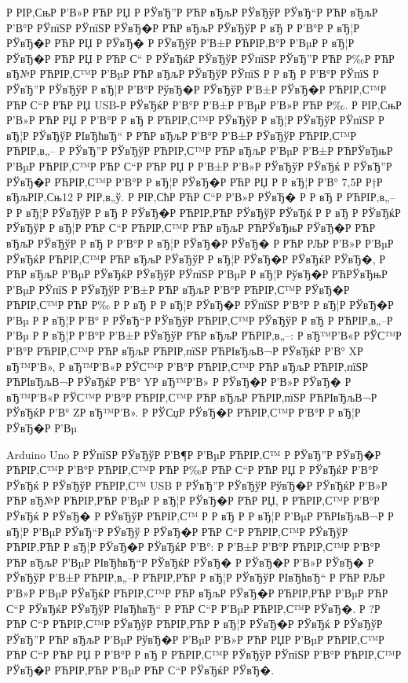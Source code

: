 \documentclass[a4paper,14pt]{extarticle}
\begin{document}
Р  РІР‚СњР  Р’В»Р РЋР РЏ Р  РЎвЂ”Р РЋР вЂљР  РЎвЂўР  РЎвЂ“Р РЋР вЂљР  Р’В°Р  РЎпїЅР  РЎпїЅР  РЎвЂ�Р РЋР вЂљР  РЎвЂўР  Р вЂ Р  Р’В°Р  Р вЂ¦Р  РЎвЂ�Р РЋР РЏ Р  РЎвЂ� Р  РЎвЂўР  Р’В±Р РЋРІР‚В°Р  Р’ВµР  Р вЂ¦Р  РЎвЂ�Р РЋР РЏ Р РЋР С“ Р  РЎвЂќР  РЎвЂўР  РЎпїЅР  РЎвЂ”Р РЋР Р‰Р РЋР вЂ№Р РЋРІР‚С™Р  Р’ВµР РЋР вЂљР  РЎвЂўР  РЎпїЅ Р  Р вЂ Р  Р’В°Р  РЎпїЅ Р  РЎвЂ”Р  РЎвЂўР  Р вЂ¦Р  Р’В°Р  РўвЂ�Р  РЎвЂўР  Р’В±Р  РЎвЂ�Р РЋРІР‚С™Р РЋР С“Р РЋР РЏ USB-Р  РЎвЂќР  Р’В°Р  Р’В±Р  Р’ВµР  Р’В»Р РЋР Р‰. Р  РІР‚СњР  Р’В»Р РЋР РЏ Р  Р’В°Р  Р вЂ Р РЋРІР‚С™Р  РЎвЂўР  Р вЂ¦Р  РЎвЂўР  РЎпїЅР  Р вЂ¦Р  РЎвЂўР  РІвЂћвЂ“ Р РЋР вЂљР  Р’В°Р  Р’В±Р  РЎвЂўР РЋРІР‚С™Р РЋРІР‚в„– Р  РЎвЂ”Р  РЎвЂўР РЋРІР‚С™Р РЋР вЂљР  Р’ВµР  Р’В±Р РЋРЎвЂњР  Р’ВµР РЋРІР‚С™Р РЋР С“Р РЋР РЏ Р  Р’В±Р  Р’В»Р  РЎвЂўР  РЎвЂќ Р  РЎвЂ”Р  РЎвЂ�Р РЋРІР‚С™Р  Р’В°Р  Р вЂ¦Р  РЎвЂ�Р РЋР РЏ Р  Р вЂ¦Р  Р’В° 7,5Р Р†Р вЂљРІР‚Сњ12 Р  РІР‚в„ў. Р  РІР‚СћР РЋР С“Р  Р’В»Р  РЎвЂ� Р  Р вЂ Р РЋРІР‚в„– Р  Р вЂ¦Р  РЎвЂўР  Р вЂ Р  РЎвЂ�Р РЋРІР‚РЋР  РЎвЂўР  РЎвЂќ Р  Р вЂ  Р  РЎвЂќР  РЎвЂўР  Р вЂ¦Р РЋР С“Р РЋРІР‚С™Р РЋР вЂљР РЋРЎвЂњР  РЎвЂ�Р РЋР вЂљР  РЎвЂўР  Р вЂ Р  Р’В°Р  Р вЂ¦Р  РЎвЂ�Р  РЎвЂ� Р РЋР РЉР  Р’В»Р  Р’ВµР  РЎвЂќР РЋРІР‚С™Р РЋР вЂљР  РЎвЂўР  Р вЂ¦Р  РЎвЂ�Р  РЎвЂќР  РЎвЂ�, Р РЋР вЂљР  Р’ВµР  РЎвЂќР  РЎвЂўР  РЎпїЅР  Р’ВµР  Р вЂ¦Р  РўвЂ�Р РЋРЎвЂњР  Р’ВµР  РЎпїЅ Р  РЎвЂўР  Р’В±Р РЋР вЂљР  Р’В°Р РЋРІР‚С™Р  РЎвЂ�Р РЋРІР‚С™Р РЋР Р‰ Р  Р вЂ Р  Р вЂ¦Р  РЎвЂ�Р  РЎпїЅР  Р’В°Р  Р вЂ¦Р  РЎвЂ�Р  Р’Вµ Р  Р вЂ¦Р  Р’В° Р  РЎвЂ“Р  РЎвЂўР РЋРІР‚С™Р  РЎвЂўР  Р вЂ Р РЋРІР‚в„–Р  Р’Вµ Р  Р вЂ¦Р  Р’В°Р  Р’В±Р  РЎвЂўР РЋР вЂљР РЋРІР‚в„–: Р вЂ™Р’В«Р  РЎС™Р  Р’В°Р РЋРІР‚С™Р РЋР вЂљР РЋРІР‚пїЅР РЋРІвЂљВ¬Р  РЎвЂќР  Р’В° XР вЂ™Р’В», Р вЂ™Р’В«Р  РЎС™Р  Р’В°Р РЋРІР‚С™Р РЋР вЂљР РЋРІР‚пїЅР РЋРІвЂљВ¬Р  РЎвЂќР  Р’В° YР вЂ™Р’В» Р  РЎвЂ�Р  Р’В»Р  РЎвЂ� Р вЂ™Р’В«Р  РЎС™Р  Р’В°Р РЋРІР‚С™Р РЋР вЂљР РЋРІР‚пїЅР РЋРІвЂљВ¬Р  РЎвЂќР  Р’В° ZР вЂ™Р’В».
Р  РЎСџР  РЎвЂ�Р РЋРІР‚С™Р  Р’В°Р  Р вЂ¦Р  РЎвЂ�Р  Р’Вµ

Arduino Uno Р  РЎпїЅР  РЎвЂўР  Р’В¶Р  Р’ВµР РЋРІР‚С™ Р  РЎвЂ”Р  РЎвЂ�Р РЋРІР‚С™Р  Р’В°Р РЋРІР‚С™Р РЋР Р‰Р РЋР С“Р РЋР РЏ Р  РЎвЂќР  Р’В°Р  РЎвЂќ Р  РЎвЂўР РЋРІР‚С™ USB Р  РЎвЂ”Р  РЎвЂўР  РўвЂ�Р  РЎвЂќР  Р’В»Р РЋР вЂ№Р РЋРІР‚РЋР  Р’ВµР  Р вЂ¦Р  РЎвЂ�Р РЋР РЏ, Р РЋРІР‚С™Р  Р’В°Р  РЎвЂќ Р  РЎвЂ� Р  РЎвЂўР РЋРІР‚С™ Р  Р вЂ Р  Р вЂ¦Р  Р’ВµР РЋРІвЂљВ¬Р  Р вЂ¦Р  Р’ВµР  РЎвЂ“Р  РЎвЂў Р  РЎвЂ�Р РЋР С“Р РЋРІР‚С™Р  РЎвЂўР РЋРІР‚РЋР  Р вЂ¦Р  РЎвЂ�Р  РЎвЂќР  Р’В°: Р  Р’В±Р  Р’В°Р РЋРІР‚С™Р  Р’В°Р РЋР вЂљР  Р’ВµР  РІвЂћвЂ“Р  РЎвЂќР  РЎвЂ� Р  РЎвЂ�Р  Р’В»Р  РЎвЂ� Р  РЎвЂўР  Р’В±Р РЋРІР‚в„–Р РЋРІР‚РЋР  Р вЂ¦Р  РЎвЂўР  РІвЂћвЂ“ Р РЋР РЉР  Р’В»Р  Р’ВµР  РЎвЂќР РЋРІР‚С™Р РЋР вЂљР  РЎвЂ�Р РЋРІР‚РЋР  Р’ВµР РЋР С“Р  РЎвЂќР  РЎвЂўР  РІвЂћвЂ“ Р РЋР С“Р  Р’ВµР РЋРІР‚С™Р  РЎвЂ�. Р  ?Р РЋР С“Р РЋРІР‚С™Р  РЎвЂўР РЋРІР‚РЋР  Р вЂ¦Р  РЎвЂ�Р  РЎвЂќ Р  РЎвЂўР  РЎвЂ”Р РЋР вЂљР  Р’ВµР  РўвЂ�Р  Р’ВµР  Р’В»Р РЋР РЏР  Р’ВµР РЋРІР‚С™Р РЋР С“Р РЋР РЏ Р  Р’В°Р  Р вЂ Р РЋРІР‚С™Р  РЎвЂўР  РЎпїЅР  Р’В°Р РЋРІР‚С™Р  РЎвЂ�Р РЋРІР‚РЋР  Р’ВµР РЋР С“Р  РЎвЂќР  РЎвЂ�.
\end{document}

